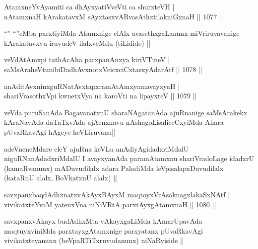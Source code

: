 \begin{shl}
AtamxneYvAyamiti ca dhAyxyatiVveVti ca shurxteVH | \\
nA\s \s tamxnaH kArakatavxM sAyxtasxvARvasAthxtilakniGxnaH \hfill||  1077 || 
\end{shl}

\begin{artha}
``\stext'' ``\stext''eMba parxtiyiMda Atamxnige elAlx avasethxgaLanunx miVriruvavanige kArakatavxvu iruvudeV ilalxveMdu (tiLidide) ||
\end{artha}


\begin{shl}
veVdAtAmx\s pi tathAcA\s \s ha parxpanAnxya kiriVTineV | \\
saMsAraheVtunibiDadhAvxnotxVcicxciCxtasxyA\s \s darAtf \hfill||  1078 || 
\end{shl}
				
\begin{shl}
anAditAvxninxguRNatAvxtapxramAtAmx\s yamavayxyaH | \\
shariVrasothxV\s pi kwnetxVya na karoVti na lipayxteV \hfill||  1079 ||  
\end{shl}

\begin{artha}
veVda puruSanAda BagavanatxnU sharaNAgatanAda ajuRnanige saMsArakekx kAraNavAda daTaTxvAda ajAcnxnavu nAshagoLisaliceCxyiMda Ahara pUvaRkavAgi hAgeye heVLiruvanu||
\end{artha}

\begin{artha}
adeVneneMdare eleY ajuRna keVLu anAdiyAgidadxriMdalU niguRNanAdadxriMdalU I avayxyanAda paramAtamxnu shariVradoLage idadxrU (kamaRvanunx) mADuvudilalx adara PaladiMda leVpisalapxDuvudilalx (kataRnU alalx, BoVkatxnU alalx) ||
\end{artha}


\begin{shl}
savxpanxbaqdAdhxnatxvAkAyxBAyxM maqtoyxVrAsaknagxlakaSxNAtf | \\
vivikatxteYvaM yatenxVna niNiVRtA parxtAyxgAtamxnaH \hfill||  1080 ||  
\end{shl}

\begin{artha}
savxpanxvAkayx budAdhxMta vAkayxgaLiMda kAmarUpavAda maqtuyxviniMda parxtayxgAtamxnige parxyatanx pUvaRkavAgi vivikatxteyanunx (beVpaRTiTxruvudanunx) niNaRyiside ||
\end{artha}

